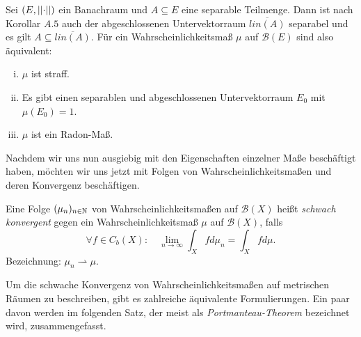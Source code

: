 \begin{remark}
    Sei $(E, \lvert\lvert \cdot \rvert\rvert)$ ein Banachraum und $A \subseteq E$ eine separable Teilmenge. Dann ist nach Korollar $A.5$ auch der abgeschlossenen Untervektorraum $\overline{lin(A)}$ separabel und es gilt $A \subseteq \overline{lin(A)}$. 
    Für ein Wahrscheinlichkeitsmaß $\mu$ auf $\mathcal{B}(E)$ sind also äquivalent: 
    \begin{enumerate}[(i)]  
        \item $\mu$ ist straff. 
        \item Es gibt einen separablen und abgeschlossenen Untervektorraum $E_0$ mit $\mu(E_0) = 1$.
        \item $\mu$ ist ein Radon-Maß. 
    \end{enumerate}
\end{remark}

Nachdem wir uns nun ausgiebig mit den Eigenschaften einzelner Maße beschäftigt haben, möchten wir uns jetzt mit Folgen von Wahrscheinlichkeitsmaßen und deren Konvergenz beschäftigen. 

\begin{mydef}
    Eine Folge $(\mu_n)_{n \in \mathbb{N}}$ von Wahrscheinlichkeitsmaßen auf $\mathcal{B}(X)$ heißt \textit{schwach konvergent} 
    gegen ein Wahrscheinlichkeitsmaß $\mu$ auf $\mathcal{B}(X)$, falls 
    $$
        \forall f \in C_b(X): \quad \lim_{n \to \infty} \int_Xfd\mu_n = \int_X fd\mu . 
    $$
    Bezeichnung: $\mu_n \rightharpoonup \mu$. 
\end{mydef}

Um die schwache Konvergenz von Wahrscheinlichkeitsmaßen auf metrischen Räumen zu beschreiben, gibt es zahlreiche äquivalente Formulierungen. 
Ein paar davon werden im folgenden Satz, der meist als \textit{Portmanteau-Theorem} bezeichnet wird, zusammengefasst. 
